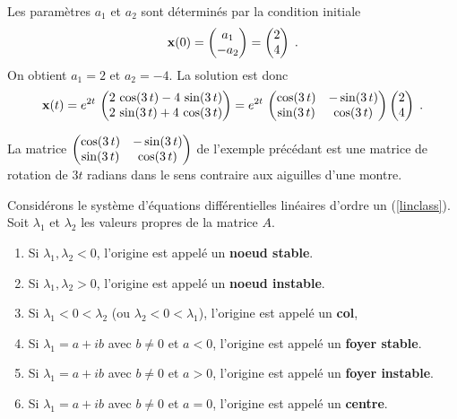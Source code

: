 {\begin{egg}
Les paramètres $a_1$ et $a_2$ sont déterminés par la condition initiale
\[
\mathbf{x}(0) = \begin{pmatrix} a_1 \\ -a_2 \end{pmatrix}
= \begin{pmatrix} 2 \\ 4 \end{pmatrix} \; .
\]
On obtient $a_1=2$ et $a_2=-4$.  La solution est donc
\[
\mathbf{x}(t) = e^{2t}\,
\begin{pmatrix}
2\,\cos(3\,t) - 4\,\sin(3\,t) \\
2\,\sin(3\,t) + 4\,\cos(3\,t)
\end{pmatrix}
= e^{2t}\,
\begin{pmatrix}
\cos(3\,t) & -\sin(3\,t) \\
\sin(3\,t) & \cos(3\,t)
\end{pmatrix}
\begin{pmatrix} 2 \\ 4 \end{pmatrix}
 \; .
\]
\end{egg}

\begin{rmk}
La matrice
$\displaystyle \begin{pmatrix}
\cos(3\,t) & -\sin(3\,t) \\
\sin(3\,t) & \cos(3\,t)
\end{pmatrix}$ de l'exemple précédant est une matrice de rotation de
$3t$ radians dans le sens contraire aux aiguilles d'une montre.
\end{rmk}

\begin{defn}
Considérons le système d'équations différentielles linéaires d'ordre un
(\ref{linclass}).   Soit $\lambda_1$ et $\lambda_2$ les valeurs
propres de la matrice $A$.
\begin{enumerate}
\item Si $\lambda_1, \lambda_2 < 0$, l'origine est appelé un 
  {\bfseries noeud stable}.
\item Si $\lambda_1, \lambda_2 > 0$, l'origine est appelé un 
  {\bfseries noeud instable}.
\item Si $\lambda_1 < 0 < \lambda_2$ (ou $\lambda_2 < 0 < \lambda_1$),
  l'origine est appelé un {\bfseries col},
\item Si $\lambda_1 = a + i b$ avec $b \neq 0$ et $a<0$, l'origine est
  appelé un {\bfseries foyer stable}.
\item Si $\lambda_1 = a + i b$ avec $b \neq 0$ et $a>0$, l'origine est
  appelé un {\bfseries foyer instable}.
\item Si $\lambda_1 = a + i b$ avec $b \neq 0$ et $a=0$, l'origine est
  appelé un {\bfseries centre}.
\end{enumerate}
\end{defn}

}
